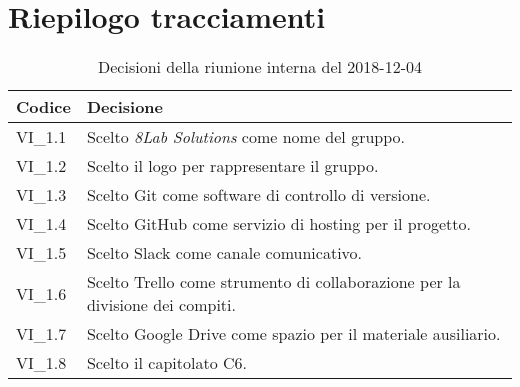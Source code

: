 \section{Riepilogo tracciamenti}

	
	\begin{longtable}{ >{\centering}p{} >{}p{}}
		\caption{Decisioni della riunione interna del 2018-12-04}\\	
		\rowcolorhead
		\textbf{\color{white}Codice} 
		& \centering\textbf{\color{white}Decisione} 
		\tabularnewline 
		\endfirsthead
		VI\_1.1 & Scelto \textit{8Lab Solutions} come nome del gruppo.
		
		\tabularnewline 
		VI\_1.2 & Scelto il logo per rappresentare il gruppo.
		
		\tabularnewline 
		VI\_1.3 & Scelto Git come software di controllo di versione.
	
		\tabularnewline 
		VI\_1.4 & Scelto GitHub come servizio di hosting per il progetto.
		
		\tabularnewline 
		VI\_1.5 & Scelto Slack come canale comunicativo.
		
		\tabularnewline 
		VI\_1.6 & Scelto Trello come strumento di collaborazione per la 
		divisione 
				dei compiti.
	
		\tabularnewline 
		VI\_1.7 & Scelto Google Drive come spazio per il materiale ausiliario.
		
		\tabularnewline
		VI\_1.8 & Scelto il capitolato C6.	
	
	\end{longtable}
	




